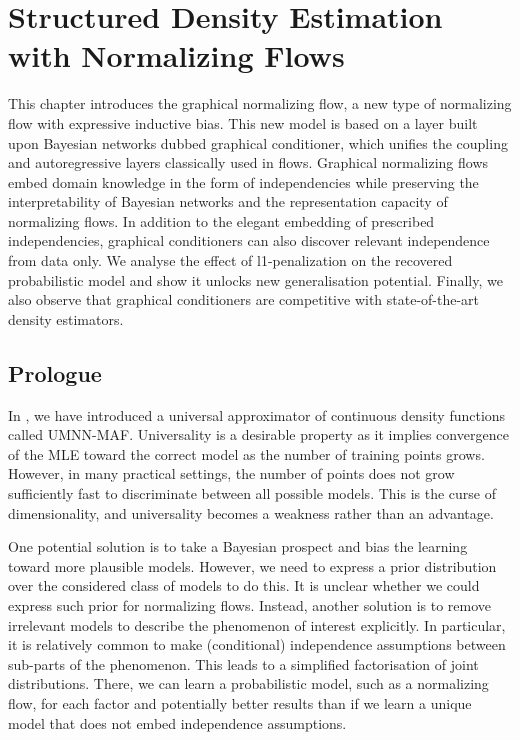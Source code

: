 

\chapter{Structured Density Estimation with Normalizing Flows}\label{ch:06}

\begin{chapter_outline}

  This chapter introduces the graphical normalizing flow, a new type of normalizing flow with expressive inductive bias. This new model is based on a layer built upon Bayesian networks dubbed graphical conditioner, which unifies the coupling and autoregressive layers classically used in flows. Graphical normalizing flows embed domain knowledge in the form of independencies while preserving the interpretability of Bayesian networks and the representation capacity of normalizing flows. In addition to the elegant embedding of prescribed independencies, graphical conditioners can also discover relevant independence from data only. We analyse the effect of l1-penalization on the recovered probabilistic model and show it unlocks new generalisation potential. Finally, we also observe that graphical conditioners are competitive with state-of-the-art density estimators.
\end{chapter_outline}

\section{Prologue}
In , we have introduced a universal approximator of continuous density functions called UMNN-MAF. Universality is a desirable property as it implies convergence of the MLE toward the correct model as the number of training points grows. However, in many practical settings, the number of points does not grow sufficiently fast to discriminate between all possible models. This is the curse of dimensionality, and universality becomes a weakness rather than an advantage.

One potential solution is to take a Bayesian prospect and bias the learning toward more plausible models. However, we need to express a prior distribution over the considered class of models to do this. It is unclear whether we could express such prior for normalizing flows. Instead, another solution is to remove irrelevant models to describe the phenomenon of interest explicitly. In particular, it is relatively common to make (conditional) independence assumptions between sub-parts of the phenomenon. This leads to a simplified factorisation of joint distributions. There, we can learn a probabilistic model, such as a normalizing flow, for each factor and potentially better results than if we learn a unique model that does not embed independence assumptions.

